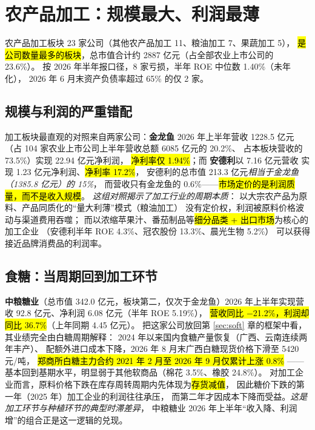 \section{农产品加工：规模最大、利润最薄}
\label{sec:processing}

农产品加工板块 \num{23} 家公司（其他农产品加工 \num{11}、粮油加工 \num{7}、果蔬加工 \num{5}），
\hl{是公司数量最多的板块}，总市值合计约 \num{2887} 亿元（占全部农业上市公司的 \num{23.6}\%）。
按 2026 年半年报口径，\num{8} 家亏损，半年 ROE 中位数 \num{1.40}\%（未年化），
2026 年 6 月末资产负债率超过 \num{65}\% 的仅 \num{2} 家。



\subsection{规模与利润的严重错配}
\label{sec:processing-scale}

加工板块最直观的对照来自两家公司：\textbf{金龙鱼} 2026 年上半年营收 \num{1228.5} 亿元
（占 \num{104} 家农业上市公司上半年营收总额 \num{6085} 亿元的 \num{20.2}\%、
占本板块营收的 \num{73.5}\%）实现 \num{22.94} 亿元净利润，
\hl{净利率仅 \num{1.94}\%}；而 \textbf{安德利}以 \num{7.16} 亿元营收
实现 \num{1.23} 亿元净利润、\hl{净利率 \num{17.2}\%}，
安德利的总市值 \num{213.3} 亿元\emph{相当于金龙鱼（\num{1385.8} 亿元）的 \num{15}\%}，
而营收只有金龙鱼的 \num{0.6}\%——\hl{市场定价的是利润质量，而不是收入规模}。
\emph{这组对照揭示了加工行业的周期本质}：
以大宗农产品为原料、产品同质化的“量大利薄”模式（粮油加工）
没有定价权，利润被原料价格波动与渠道费用吞噬；
而以浓缩苹果汁、番茄制品等\hl{细分品类 + 出口市场}为核心的加工企业
（安德利半年 ROE \num{4.3}\%、冠农股份 \num{13.3}\%、晨光生物 \num{5.2}\%）
可以获得接近品牌消费品的利润率。

\subsection{食糖：当周期回到加工环节}
\label{sec:processing-sugar}

\textbf{中粮糖业}（总市值 \num{342.0} 亿元，板块第二，仅次于金龙鱼）2026 年上半年实现营收
\num{92.8} 亿元、净利润 \num{6.08} 亿元（半年 ROE \num{5.19}\%），
\hl{营收同比 \num{-21.2}\%，利润却同比 \num{+36.7}\%}（上年同期 \num{4.45} 亿元）。
把这家公司放回第 \ref{sec:soft} 章的框架中看，其业绩完全由白糖周期解释：
2024 年以来国内食糖产量恢复（广西、云南连续两年丰产）、
配额外进口成本下降，2026 年 8 月末广西白糖现货价格下滑至 \num{5420} 元/吨，
\hl{郑商所白糖主力合约 2021 年 2 月至 2026 年 9 月仅累计上涨 \num{0.8}\%}
——基本回到基期水平，明显弱于其他软商品（棉花 \num{3.5}\%、橡胶 \num{24.8}\%）。
对加工企业而言，原料价格下跌在库存周转周期内先体现为\hl{存货减值}，
因此糖价下跌的第一年（2025 年）加工企业的利润往往承压，
而第二年才因成本下降而受益。\emph{这是加工环节与种植环节的典型时滞差异}，
中粮糖业 2026 年上半年“收入降、利润增”的组合正是这一逻辑的兑现。

